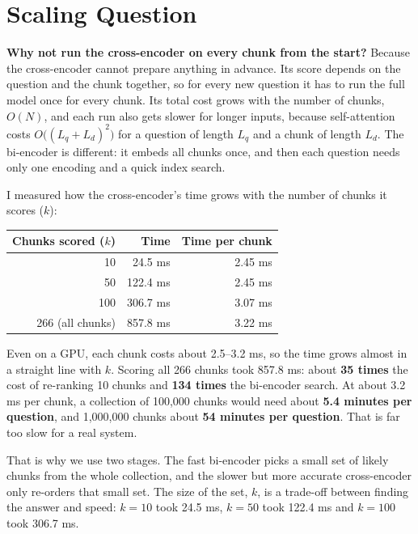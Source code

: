 \documentclass[11pt,a4paper]{article}
\begin{document}
\section{Scaling Question}

\textbf{Why not run the cross-encoder on every chunk from the start?} Because the cross-encoder cannot prepare anything in advance. Its score depends on the question and the chunk together, so for every new question it has to run the full model once for every chunk. Its total cost grows with the number of chunks, $O(N)$, and each run also gets slower for longer inputs, because self-attention costs $O\big((L_q + L_d)^2\big)$ for a question of length $L_q$ and a chunk of length $L_d$. The bi-encoder is different: it embeds all chunks once, and then each question needs only one encoding and a quick index search.

I measured how the cross-encoder's time grows with the number of chunks it scores ($k$):

\begin{center}
\begin{tabular}{rrr}
\toprule
\textbf{Chunks scored ($k$)} & \textbf{Time} & \textbf{Time per chunk} \\
\midrule
10 & 24.5 ms & 2.45 ms \\
50 & 122.4 ms & 2.45 ms \\
100 & 306.7 ms & 3.07 ms \\
266 (all chunks) & 857.8 ms & 3.22 ms \\
\bottomrule
\end{tabular}
\end{center}

Even on a GPU, each chunk costs about 2.5--3.2 ms, so the time grows almost in a straight line with $k$. Scoring all 266 chunks took 857.8 ms: about \textbf{35 times} the cost of re-ranking 10 chunks and \textbf{134 times} the bi-encoder search. At about 3.2 ms per chunk, a collection of 100,000 chunks would need about \textbf{5.4 minutes per question}, and 1,000,000 chunks about \textbf{54 minutes per question}. That is far too slow for a real system.

That is why we use two stages. The fast bi-encoder picks a small set of likely chunks from the whole collection, and the slower but more accurate cross-encoder only re-orders that small set. The size of the set, $k$, is a trade-off between finding the answer and speed: $k = 10$ took 24.5 ms, $k = 50$ took 122.4 ms and $k = 100$ took 306.7 ms.
\end{document}
